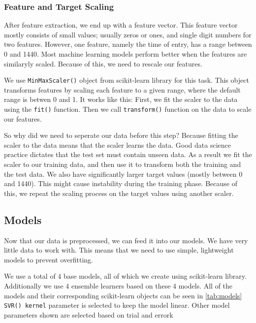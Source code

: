 \subsubsection{Feature and Target Scaling}
After feature extraction, we end up with a feature vector.
This feature vector mostly consists of small values; usually zeros or ones, and single digit numbers for two features.
However, one feature, namely the time of entry, has a range between 0 and 1440.
Most machine learning models perform better when the features are similaryly scaled.
Because of this, we need to rescale our features.

We use \texttt{MinMaxScaler()} object from scikit-learn library for this task.
This object transforms features by scaling each feature to a given range, where the default range is betwen 0 and 1.
It works like this: First, we fit the scaler to the data using the \texttt{fit()} function.
Then we call \texttt{transform()} function on the data to scale our features.

So why did we need to seperate our data before this step?
Because fitting the scaler to the data means that the scaler learns the data.
Good data science practice dictates that the test set must contain unseen data.
As a result we fit the scaler to our training data, and then use it to transform both the training and the test data.
We also have significantly larger target values (mostly between 0 and 1440).
This might cause instability during the training phase.
Because of this, we repeat the scaling process on the target values using another scaler.

\subsection{Models}
Now that our data is preprocessed, we can feed it into our models.
We have very little data to work with.
This means that we need to use simple, lightweight models to prevent overfitting.

We use a total of 4 base models, all of which we create using scikit-learn library.
Additionally we use 4 ensemble learners based on these 4 models.
All of the models and their corresponding scikit-learn objects can be seen in \autoref{tab:models}
\texttt{SVR() kernel} parameter is selected to keep the model linear.
Other model parameters shown are selected based on trial and errork

